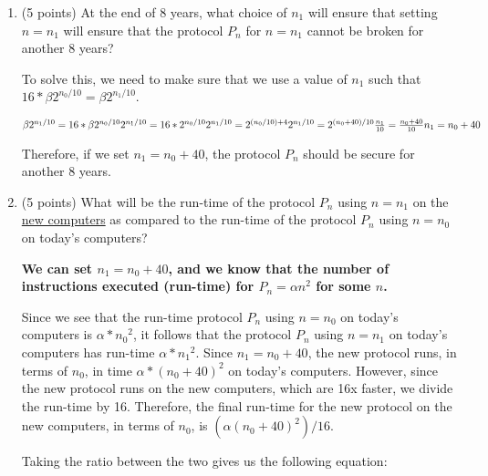 \documentclass[11pt]{article}
\begin{document}
\begin{enumerate}
\begin{enumerate}
{      Assuming Moore's law, CPUs will be 16x faster 8 years in the future as compared to CPUs now.
  }
  \vfill
  \item (5 points) At the end of 8 years, what choice of $n_1$ will ensure that setting $n=n_1$ will ensure that the protocol $P_n$ for $n=n_1$ cannot be broken for another 8 years? 
  {\bfseries 

      To solve this, we need to make sure that we use a value of $n_1$ such that $16 * \beta 2^{n_0/10} = \beta 2^{n_1/10}$. \newline

      $
      \beta2^{n_1/10} = 16*\beta2^{n_0/10} \newline
      2^{n_1/10} = 16*2^{n_0/10} \newline
      2^{n_1/10} = 2^{(n_0/10) + 4} \newline
      2^{n_1/10} = 2^{(n_0 + 40)/10} \newline
      \frac{n_1}{10} = \frac{n_0 + 40}{10} \newline
      n_1 = n_0 + 40 \newline
      $

      Therefore, if we set $n_1 = n_0 + 40$, the protocol $P_n$ should be secure for another 8 years.
  }
  \vfill
\newpage  
  \item (5 points) What will be the run-time of the protocol $P_n$ using $n=n_1$ on the \underline{new computers} as compared to the run-time of the protocol $P_n$ using $n=n_0$ on today's computers? 
  {\bfseries 
      \newline
      \newline
      We can set $n_1 = n_0 + 40$, and we know that the number of instructions executed (run-time) for $P_n = \alpha n^2$ for some $n$. \newline

      Since we see that the run-time protocol $P_n$ using $n=n_0$ on today's computers is $\alpha*{n_0}^2$, it follows that the protocol $P_n$ using $n=n_1$ on today's computers has run-time $\alpha*{n_1}^2$. Since $n_1=n_0+40$, the new protocol runs, in terms of $n_0$, in time $\alpha*(n_0+40)^2$ on today's computers. However, since the new protocol runs on the new computers, which are 16x faster, we divide the run-time by 16. Therefore, the final run-time for the new protocol on the new computers, in terms of $n_0$, is $(\alpha(n_0+40)^2)/16$.

      Taking the ratio between the two gives us the following equation: \newline

}
\end{enumerate}
\end{enumerate}
\end{document}
